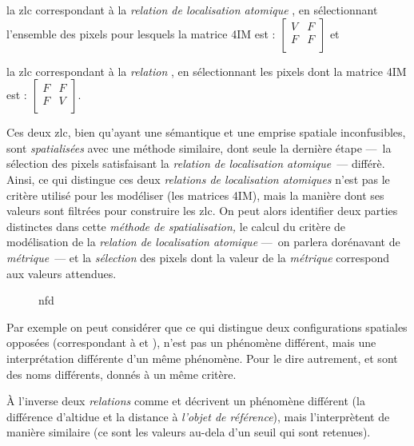 % 
\begin{enumerate*}[label=(\alph*)]
\item la \ac{zlc} correspondant à la \emph{relation de localisation atomique} , en sélectionnant l'ensemble des pixels pour lesquels la matrice 4IM est : \(\left[\begin{smallmatrix}V&F\\F&F\\\end{smallmatrix}\right]\) et
\item la \ac{zlc} correspondant à la \emph{relation} , en sélectionnant les pixels dont la matrice 4IM est : \(\left[\begin{smallmatrix}F&F\\F&V\\\end{smallmatrix}\right]\).
\end{enumerate*}
%
Ces deux \ac{zlc}, bien qu'ayant une sémantique et une emprise spatiale inconfusibles, sont \emph{spatialisées} avec une méthode similaire, dont seule la dernière étape ---~la sélection des pixels satisfaisant la \emph{relation de localisation atomique}~--- différè.
Ainsi, ce qui distingue ces deux \emph{relations de localisation atomiques} n'est pas le critère utilisé pour les modéliser (\ie les matrices 4IM), mais la manière dont ses valeurs sont filtrées pour construire les \ac{zlc}. On peut alors identifier deux parties distinctes dans cette \emph{méthode de spatialisation,} le calcul du critère de modélisation de la \emph{relation de localisation atomique} ---~on parlera dorénavant de \emph{métrique}~--- et la \emph{sélection} des pixels dont la valeur de la \emph{métrique} correspond aux valeurs attendues.

\begin{figure}
  \centering
  
  \caption{nfd}
  \label{fig:Exemple_Metrique_vs_Selecteur}
\end{figure}



Par exemple on peut considérer que ce qui distingue deux configurations spatiales opposées (\eg correspondant à  et ), n'est pas un phénomène différent, mais une interprétation différente d'un même phénomène. Pour le dire autrement,  et  sont des noms différents, donnés à un même critère.

À l'inverse deux \emph{relations} comme  et  décrivent un phénomène différent (\ie la différence d'altidue et la distance à \emph{l'objet de référence}), mais l’interprètent de manière similaire (ce sont les valeurs au-dela d'un seuil qui sont retenues).

